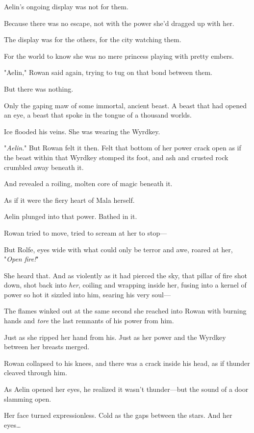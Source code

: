 Aelin's ongoing display was not for them.

Because there was no escape, not with the power she'd dragged up with her.

The display was for the others, for the city watching them.

For the world to know she was no mere princess playing with pretty embers.

"Aelin," Rowan said again, trying to tug on that bond between them.

But there was nothing.

Only the gaping maw of some immortal, ancient beast.
A beast that had opened an eye, a beast that spoke in the tongue of a thousand worlds.

Ice flooded his veins.
She was wearing the Wyrdkey.

"\emph{Aelin}."
But Rowan felt it then.
Felt that bottom of her power crack open as if the beast within that Wyrdkey stomped its foot, and ash and crusted rock crumbled away beneath it.

And revealed a roiling, molten core of magic beneath it.

As if it were the fiery heart of Mala herself.

Aelin plunged into that power.
Bathed in it.

Rowan tried to move, tried to scream at her to stop---

But Rolfe, eyes wide with what could only be terror and awe, roared at her, "\emph{Open fire!}"

She heard that.
And as violently as it had pierced the sky, that pillar of fire shot down, shot back into \emph{her}, coiling and wrapping inside her, fusing into a kernel of power so hot it sizzled into him, searing his very soul---

The flames winked out at the same second she reached into Rowan with burning hands and \emph{tore} the last remnants of his power from him.

Just as she ripped her hand from his.
Just as her power and the Wyrdkey between her breasts merged.

Rowan collapsed to his knees, and there was a crack inside his head, as if thunder cleaved through him.

As Aelin opened her eyes, he realized it wasn't thunder---but the sound of a door slamming open.

Her face turned expressionless.
Cold as the gaps between the stars.
And her eyes\ldots{}

